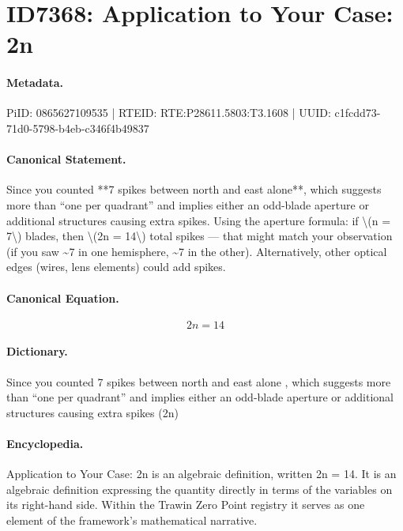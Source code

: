 \section*{ID7368: Application to Your Case: 2n}
\paragraph{Metadata.}
PiID: 0865627109535 | RTEID: RTE:P28611.5803:T3.1608 | UUID: c1fcdd73-71d0-5798-b4eb-c346f4b49837

\paragraph{Canonical Statement.}
Since you counted **7 spikes between north and east alone**, which suggests more than “one per quadrant” and implies either an odd-blade aperture or additional structures causing extra spikes. Using the aperture formula: if \textbackslash{}(n = 7\textbackslash{}) blades, then \textbackslash{}(2n = 14\textbackslash{}) total spikes — that might match your observation (if you saw \textasciitilde{}7 in one hemisphere, \textasciitilde{}7 in the other). Alternatively, other optical edges (wires, lens elements) could add spikes.

\paragraph{Canonical Equation.}
\[
2n = 14
\]

\paragraph{Dictionary.}
Since you counted 7 spikes between north and east alone , which suggests more than “one per quadrant” and implies either an odd-blade aperture or additional structures causing extra spikes (2n)

\paragraph{Encyclopedia.}
Application to Your Case: 2n is an algebraic definition, written 2n = 14. It is an algebraic definition expressing the quantity directly in terms of the variables on its right-hand side. Within the Trawin Zero Point registry it serves as one element of the framework's mathematical narrative.
